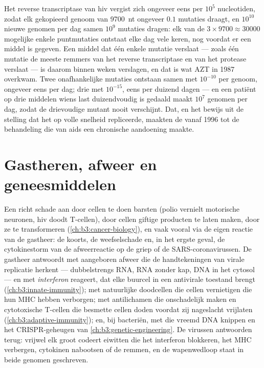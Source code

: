 \begin{example}\label{ex:b3:virology:three-drugs}
Het reverse transcriptase van hiv vergist zich ongeveer eens per
$10^{5}$ nucleotiden, zodat elk gekopieerd genoom van \qty{9700}{nt}
ongeveer $0.1$ mutaties draagt, en $10^{10}$ nieuwe genomen per dag
samen $10^{9}$ mutaties dragen: elk van de
$3\times 9700 \approx \num{30000}$ mogelijke enkele puntmutaties
ontstaat elke dag vele keren, nog voordat er een middel is gegeven. Een
middel dat één enkele mutatie verslaat --- zoals één mutatie de meeste
remmers van het reverse transcriptase en van het protease verslaat ---
is daarom binnen weken verslagen, en dat is wat AZT in 1987 overkwam.
Twee onafhankelijke mutaties ontstaan samen met $10^{-10}$ per genoom,
ongeveer eens per dag; drie met $10^{-15}$, eens per duizend dagen ---
en een patiënt op drie middelen wiens last duizendvoudig is gedaald
maakt $10^{7}$ genomen per dag, zodat de drievoudige mutant nooit
verschijnt. Dat, en het bewijs uit de stelling dat het  op volle
snelheid repliceerde, maakten de  vanaf 1996 tot de
behandeling die van aids een chronische aandoening maakte.
\end{example}

\section{Gastheren, afweer en geneesmiddelen}

\begin{proposition}\label{prop:b3:virology:pathogenesis}
Een  richt schade aan door cellen te doen barsten (polio vernielt
motorische neuronen, hiv doodt T-cellen), door cellen giftige producten
te laten maken, door ze te transformeren
(\cref{ch:b3:cancer-biology}), en vaak vooral via de eigen reactie van
de gastheer: de koorts, de weefselschade en, in het ergste geval, de
cytokinestorm van de afweerreactie op de griep of de
SARS-coronavirussen. De gastheer antwoordt met aangeboren afweer die de
handtekeningen van virale replicatie herkent --- dubbelstrengs RNA, RNA
zonder kap, DNA in het cytosol --- en met \emph{interferon} reageert,
dat elke buurcel in een antivirale toestand brengt
(\cref{ch:b3:innate-immunity}); met natuurlijke doodcellen die cellen
vernietigen die hun MHC hebben verborgen; met antilichamen die 
onschadelijk maken en cytotoxische T-cellen die besmette cellen doden
voordat zij nageslacht vrijlaten
(\cref{ch:b3:adaptive-immunity}); en, bij bacteriën, met
 die vreemd DNA knippen en het CRISPR-geheugen van
\cref{ch:b3:genetic-engineering}. De virussen antwoorden terug: vrijwel
elk groot  codeert eiwitten die het interferon blokkeren, het MHC
verbergen, cytokinen nabootsen of de  remmen, en de wapenwedloop
staat in beide genomen geschreven.
\end{proposition}


